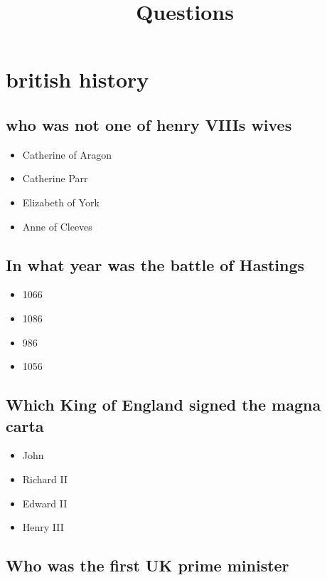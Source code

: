 \documentclass{article}
\title{Questions}
\begin{document}
\maketitle


\section{british history}

\subsection{who was not one of henry VIIIs wives}

\begin{itemize}
\item Catherine of Aragon
\item Catherine Parr
\item Elizabeth of York
\item Anne of Cleeves

\end{itemize}

\subsection{In what year was the battle of Hastings}

\begin{itemize}
\item 1066
\item 1086
\item 986
\item 1056

\end{itemize}


\subsection{Which King of England signed the magna carta}

\begin{itemize}
\item John
\item Richard II
\item Edward II
\item Henry III

\end{itemize}

\subsection{Who was the first UK prime minister}
\end{document}
